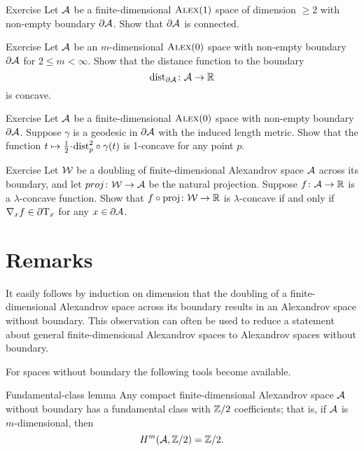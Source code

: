 \begin{thm}{Exercise}\label{ex:bry-connected}
Let $\mathcal{A}$ be a finite-dimensional $\textsc{Alex}(1)$ space of dimension $\ge 2$ with non-empty boundary $\partial\mathcal{A}$.
Show that $\partial\mathcal{A}$ is connected.
\end{thm}


\begin{thm}{Exercise}\label{ex:dist-to-bry}
Let $\mathcal{A}$ be an $m$-dimensional $\textsc{Alex}(0)$ space with non-empty boundary $\partial\mathcal{A}$
for $2\le m<\infty$.
Show that the distance function to the boundary
\[\mathrm{dist}_{\partial\mathcal{A}}\colon\mathcal{A}\to\mathbb{R}\]
is concave.
\end{thm}

\begin{thm}{Exercise}\label{ex:liberman}
Let $\mathcal{A}$ be a finite-dimensional $\textsc{Alex}(0)$ space with non-empty boundary $\partial\mathcal{A}$.
Suppose $\gamma$ is a geodesic in $\partial\mathcal{A}$ with the induced length metric.
Show that the function $t\mapsto \tfrac12\cdot\distfun_p^2\circ\gamma(t)$ is 1-concave for any point $p$. 
\end{thm}

\begin{thm}{Exercise}\label{ex:native}
Let $\mathcal{W}$ be a doubling of finite-dimensional Alexandrov space $\mathcal{A}$ across its boundary,
and let $proj\colon\mathcal{W}\to\mathcal{A}$ be the natural projection.
Suppose $f\colon\mathcal{A}\to\mathbb{R}$ is a $\lambda$-concave function.
Show that $f\circ\operatorname{\rm proj}\nolimits\colon\mathcal{W}\to\mathbb{R}$ is $\lambda$-concave if and only if $\nabla_xf\in \partial \mathrm{T}_x$ 
for any $x\in\partial \mathcal{A}$.
\end{thm}



\section{Remarks}

It easily follows by induction on dimension  that the doubling of a finite-dimensional Alexandrov space across its boundary results in an Alexandrov space without boundary.
This observation can often be used to reduce a statement about general finite-dimensional Alexandrov spaces to  Alexandrov spaces without boundary.

For spaces without boundary the following tools become available.

\begin{thm}{Fundamental-class lemma}\label{lem:fund-class}
Any compact finite-dimensional Alexandrov space $\mathcal{A}$ without boundary has a fundamental class with $\mathbb{Z}/2$ coefficients;
that is, if $\mathcal{A}$ is $m$-dimensional, then
\[H^m(\mathcal{A},\mathbb{Z}/2)=\mathbb{Z}/2.\]

\end{thm}


